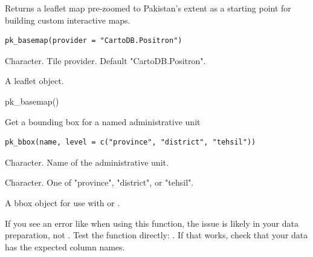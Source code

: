 \documentclass[a4paper]{book}
\begin{document}
%
\begin{Description}
Returns a leaflet map pre-zoomed to Pakistan's extent as a starting
point for building custom interactive maps.
\end{Description}
%
\begin{Usage}
\begin{verbatim}
pk_basemap(provider = "CartoDB.Positron")
\end{verbatim}
\end{Usage}
%
\begin{Arguments}
\begin{ldescription}
\item[\code{provider}] Character. Tile provider. Default "CartoDB.Positron".
\end{ldescription}
\end{Arguments}
%
\begin{Value}
A leaflet object.
\end{Value}
%
\begin{Examples}
\begin{ExampleCode}

  pk_basemap()

\end{ExampleCode}
\end{Examples}
%
\begin{Description}
Get a bounding box for a named administrative unit
\end{Description}
%
\begin{Usage}
\begin{verbatim}
pk_bbox(name, level = c("province", "district", "tehsil"))
\end{verbatim}
\end{Usage}
%
\begin{Arguments}
\begin{ldescription}
\item[\code{name}] Character. Name of the administrative unit.

\item[\code{level}] Character. One of "province", "district", or "tehsil".
\end{ldescription}
\end{Arguments}
%
\begin{Value}
A bbox object for use with  or
.
\end{Value}
%
\begin{Note}
If you see an error like  when using this
function, the issue is likely in your data preparation, not .
Test the function directly: .
If that works, check that your data has the expected column names.
\end{Note}
\end{document}

